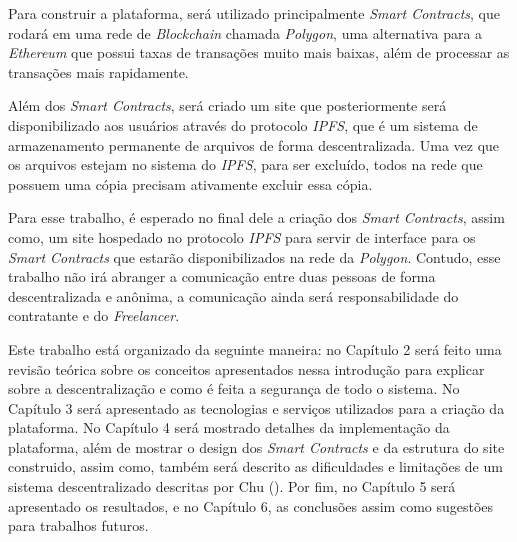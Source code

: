 Para construir a plataforma, será utilizado principalmente \textit{Smart Contracts}, que rodará em uma rede de \textit{Blockchain} chamada \textit{Polygon}, uma alternativa para a \textit{Ethereum} que possui taxas de transações muito mais baixas, além de processar as transações mais rapidamente. \cite{polygon}

Além dos \textit{Smart Contracts}, será criado um site que posteriormente será disponibilizado aos usuários através do protocolo \textit{IPFS}, que é um sistema de armazenamento permanente de arquivos de forma descentralizada. Uma vez que os arquivos estejam no sistema do \textit{IPFS}, para ser excluído, todos na rede que possuem uma cópia precisam ativamente excluir essa cópia.\cite{ipfs}

Para esse trabalho, é esperado no final dele a criação dos \textit{Smart Contracts}, assim como, um site hospedado no protocolo \textit{IPFS} para servir de interface para os \textit{Smart Contracts} que estarão disponibilizados na rede da \textit{Polygon}. Contudo, esse trabalho não irá abranger a comunicação entre duas pessoas de forma descentralizada e anônima, a comunicação ainda será responsabilidade do contratante e do \textit{Freelancer}.

Este trabalho está organizado da seguinte maneira: no Capítulo 2 será feito uma revisão teórica sobre os conceitos apresentados nessa introdução para explicar sobre a descentralização e como é feita a segurança de todo o sistema. No Capítulo 3 será apresentado as tecnologias e serviços utilizados para a criação da plataforma. No Capítulo 4 será mostrado detalhes da implementação da plataforma, além de mostrar o design dos \textit{Smart Contracts} e da estrutura do site construido, assim como, também será descrito as dificuldades e limitações de um sistema descentralizado descritas por Chu (\citeyear{curses_of_blockchain}). Por fim, no Capítulo 5 será apresentado os resultados, e no Capítulo 6, as conclusões assim como sugestões para trabalhos futuros.
